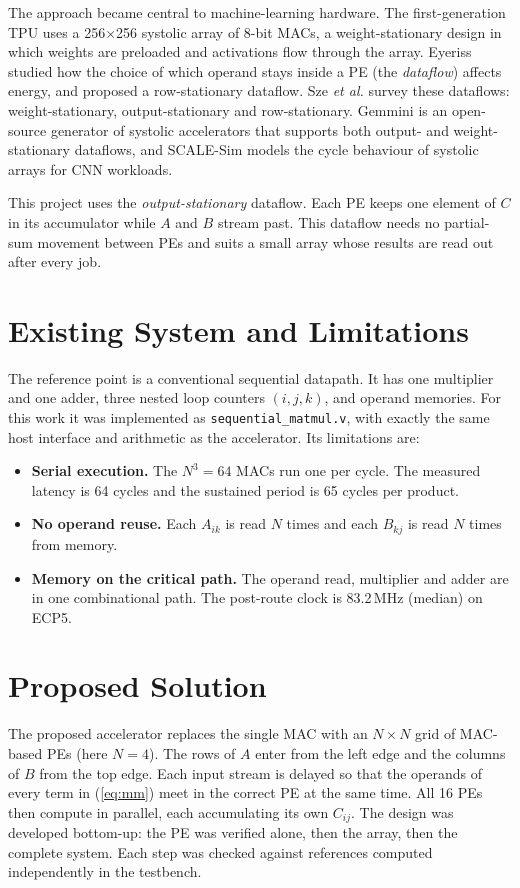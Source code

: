 \documentclass[conference]{IEEEtran}
\begin{document}
The approach became central to machine-learning hardware. The first-generation TPU \cite{jouppi2017} uses a 256$\times$256 systolic array of 8-bit MACs, a weight-stationary design in which weights are preloaded and activations flow through the array. Eyeriss \cite{chen2017} studied how the choice of which operand stays inside a PE (the \emph{dataflow}) affects energy, and proposed a row-stationary dataflow. Sze \emph{et al.} \cite{sze2017} survey these dataflows: weight-stationary, output-stationary and row-stationary. Gemmini \cite{genc2021} is an open-source generator of systolic accelerators that supports both output- and weight-stationary dataflows, and SCALE-Sim \cite{samajdar2018} models the cycle behaviour of systolic arrays for CNN workloads.

This project uses the \emph{output-stationary} dataflow. Each PE keeps one element of $C$ in its accumulator while $A$ and $B$ stream past. This dataflow needs no partial-sum movement between PEs and suits a small array whose results are read out after every job.

\section{Existing System and Limitations}
The reference point is a conventional sequential datapath. It has one multiplier and one adder, three nested loop counters $(i,j,k)$, and operand memories. For this work it was implemented as \texttt{sequential\_matmul.v}, with exactly the same host interface and arithmetic as the accelerator. Its limitations are:
\begin{itemize}
\item \textbf{Serial execution.} The $N^3=64$ MACs run one per cycle. The measured latency is 64 cycles and the sustained period is 65 cycles per product.
\item \textbf{No operand reuse.} Each $A_{ik}$ is read $N$ times and each $B_{kj}$ is read $N$ times from memory.
\item \textbf{Memory on the critical path.} The operand read, multiplier and adder are in one combinational path. The post-route clock is 83.2\,MHz (median) on ECP5.
\end{itemize}

\section{Proposed Solution}
The proposed accelerator replaces the single MAC with an $N\times N$ grid of MAC-based PEs (here $N=4$). The rows of $A$ enter from the left edge and the columns of $B$ from the top edge. Each input stream is delayed so that the operands of every term in (\ref{eq:mm}) meet in the correct PE at the same time. All 16 PEs then compute in parallel, each accumulating its own $C_{ij}$. The design was developed bottom-up: the PE was verified alone, then the array, then the complete system. Each step was checked against references computed independently in the testbench.
\end{document}
